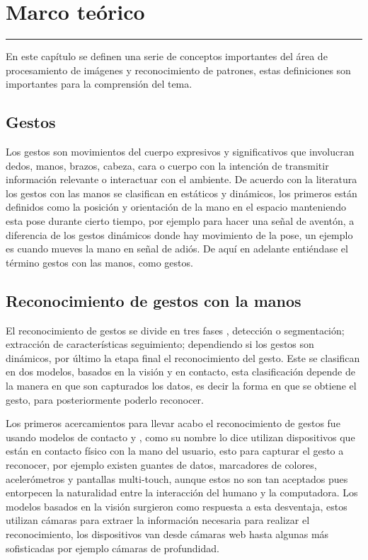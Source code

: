 \chapter{Marco te\'orico}\label{capit:cap2}
\vspace{-2.0325ex}%
\noindent
\rule{\textwidth}{0.5pt}
\vspace{-5.5ex}%
\newcommand{\pushline}{\Indp}%

En este capítulo se definen una serie de conceptos importantes del área de procesamiento de imágenes y reconocimiento de patrones, estas definiciones son importantes para la comprensión del tema.



\section{Gestos}\label{sec:2Gestos}
Los gestos \citep{Mitra2007} son movimientos del cuerpo expresivos y significativos que involucran dedos, manos, brazos, cabeza, cara o cuerpo con la intención de transmitir información relevante o interactuar con el ambiente. De acuerdo con la literatura \citep{Mitra2007} los gestos con las manos se clasifican en estáticos y dinámicos, los primeros están definidos como la posición y orientación de la mano en el espacio manteniendo esta pose durante cierto tiempo, por ejemplo para hacer una se\~nal de aventón, a diferencia de los gestos dinámicos donde hay movimiento de la pose, un ejemplo  es cuando mueves la mano en se\~nal de adiós. De aquí en adelante entiéndase el término gestos con las manos, como gestos.  

\section{Reconocimiento de gestos con la manos}\label{sec:2ReconocimientoGestos}  

 

El reconocimiento de gestos se divide en tres fases \citep{Rautaray2012}, detección o segmentación; extracción de características seguimiento; dependiendo si los gestos son dinámicos, por último la etapa final el reconocimiento del gesto.  
Este se clasifican en dos modelos, basados en la visión y en contacto, esta clasificación depende de la manera en que son capturados los datos, es decir la forma en que se obtiene el gesto, para posteriormente poderlo reconocer. 

Los primeros acercamientos para llevar acabo el reconocimiento de gestos fue usando modelos de contacto \citep{Rautaray2012} y \citep{Nayakwadi2014}, como su nombre lo dice utilizan dispositivos que est\'an en contacto f\'isico con la mano del usuario, esto para capturar el gesto a reconocer, por ejemplo existen guantes de datos, marcadores de colores, acelerómetros y pantallas multi-touch, aunque estos no son tan aceptados pues entorpecen la naturalidad entre la interacción del humano y la computadora. Los modelos basados en la visión surgieron como respuesta a esta desventaja, estos utilizan cámaras para extraer la información necesaria para realizar el reconocimiento, los dispositivos van desde c\'amaras web hasta algunas más sofisticadas por ejemplo c\'amaras de profundidad.  

